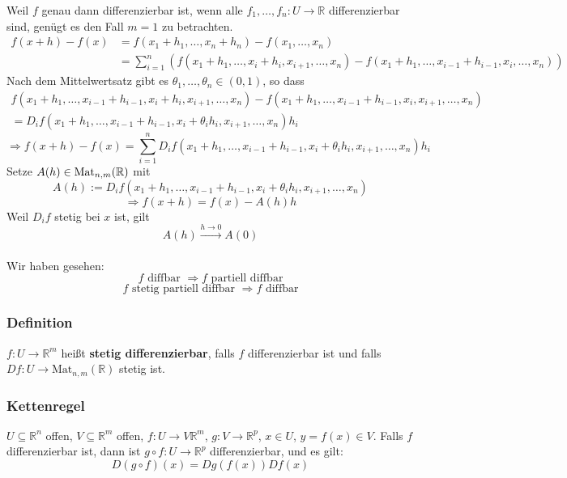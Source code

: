 Weil $f$ genau dann differenzierbar ist, wenn alle $f_1 , \dots , f_n: U \to \mathbb{R} $ differenzierbar sind, genügt es den Fall $m=1$ zu betrachten.
\begin{align*}
	f(x+h) - f(x) &= f(x_1+h_1, \dots ,x_n+h_n) - f(x_1, \dots, x_n) \\
	&= \sum^{n}_{i=1} \left( f(x_1+h_1, \dots,x_i+h_i,x_{i+1} ,\dots,x_n) - f(x_1+h_1, \dots,x_{i-1}+h_{i-1},x_{i} ,\dots,x_n) \right)
\end{align*}
Nach dem Mittelwertsatz gibt es $\theta_1, \dots , \theta_n \in (0,1)$, so dass
\begin{gather*}
	f(x_1+h_1, \dots,x_{i-1}+h_{i-1},x_i+h_i,x_{i+1} ,\dots,x_n) - f(x_1+h_1, \dots,x_{i-1}+h_{i-1},x_i,x_{i+1} ,\dots,x_n) \\
	= D_if(x_1+h_1, \dots,x_{i-1}+h_{i-1},x_{i}+\theta_ih_i,x_{i+1} ,\dots,x_n)h_i 
\end{gather*}
\[
	\Rightarrow f(x+h)-f(x)= \sum^{n}_{i=1}D_if(x_1+h_1, \dots,x_{i-1}+h_{i-1},x_{i}+\theta_ih_i,x_{i+1} ,\dots,x_n)h_i 
\]
Setze $A(h) \in \operatorname{Mat}_{n,m}(\mathbb{R})$ mit
\[
	A(h):= D_if(x_1+h_1, \dots,x_{i-1}+h_{i-1},x_{i}+\theta_ih_i,x_{i+1} ,\dots,x_n)
\]
\[
	\Rightarrow f(x+h)=f(x)-A(h)h
\]
Weil $D_if$ stetig bei $x$ ist, gilt
\[
	A(h) \stackrel{h \to 0}{\longrightarrow} A(0)
\]
\bewende \\
Wir haben gesehen: 
\[
	f \text{ diffbar } \Rightarrow f \text{ partiell diffbar}
\]
\[
	f \text{ stetig partiell diffbar } \Rightarrow f \text{ diffbar}
\]
\subsubsection{Definition} %
\label{ssub:definition}
$f: U \to \mathbb{R}^m$ heißt {\bfseries stetig differenzierbar}, falls $f$ differenzierbar ist und falls $Df: U \to \text{Mat}_{n,m}(\mathbb{R})$ stetig ist.

\subsubsection{Kettenregel} %
\label{ssub:kettenregel}
$U \subseteq \mathbb{R}^n$ offen, $V \subseteq \mathbb{R}^m$ offen, $f:U \to V \mathbb{R}^m$, $g: V \to \mathbb{R}^p$, $x \in U$, $y=f(x) \in V$. Falls $f$ 
differenzierbar ist, dann ist $g \circ f: U \to \mathbb{R}^p$ differenzierbar, und es gilt:
\[
	D(g \circ f)(x) = Dg(f(x))Df(x)
\]

